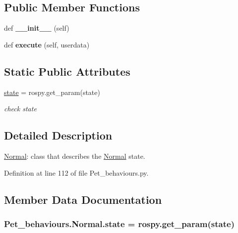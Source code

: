 \subsection*{Public Member Functions}
\begin{DoxyCompactItemize}
\item 
def {\bfseries \+\_\+\+\_\+init\+\_\+\+\_\+} (self)\hypertarget{classPet__behaviours_1_1Normal_a04301ed05d5952e591268a758309862b}{}\label{classPet__behaviours_1_1Normal_a04301ed05d5952e591268a758309862b}

\item 
def {\bfseries execute} (self, userdata)\hypertarget{classPet__behaviours_1_1Normal_a2bbd4605a4cdc6dc02f5e80af5b614a0}{}\label{classPet__behaviours_1_1Normal_a2bbd4605a4cdc6dc02f5e80af5b614a0}

\end{DoxyCompactItemize}
\subsection*{Static Public Attributes}
\begin{DoxyCompactItemize}
\item 
\hyperlink{classPet__behaviours_1_1Normal_a8a500787fd6cc1891b861a4d11e8ca7f}{state} = rospy.\+get\+\_\+param(\textquotesingle{}state\textquotesingle{})
\begin{DoxyCompactList}\small\item\em check state \end{DoxyCompactList}\end{DoxyCompactItemize}


\subsection{Detailed Description}
\hyperlink{classPet__behaviours_1_1Normal}{Normal}\+: class that describes the \hyperlink{classPet__behaviours_1_1Normal}{Normal} state. 

Definition at line 112 of file Pet\+\_\+behaviours.\+py.



\subsection{Member Data Documentation}
\subsubsection[{\texorpdfstring{state}{state}}]{\setlength{\rightskip}{0pt plus 5cm}Pet\+\_\+behaviours.\+Normal.\+state = rospy.\+get\+\_\+param(\textquotesingle{}state\textquotesingle{})\hspace{0.3cm}{\ttfamily [static]}}\hypertarget{classPet__behaviours_1_1Normal_a8a500787fd6cc1891b861a4d11e8ca7f}{}\label{classPet__behaviours_1_1Normal_a8a500787fd6cc1891b861a4d11e8ca7f}


